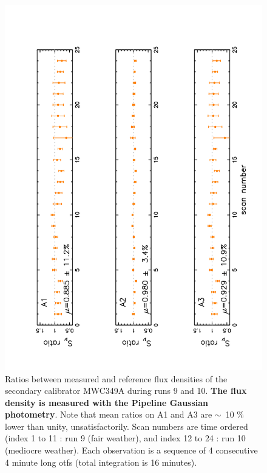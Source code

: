 \begin{figure}[p]
\begin{center}
  \includegraphics[clip, angle=-90, scale=0.6]{Figures/Ratio_vs_index_MWC349_r9_r10_NK.pdf}
  \caption{Ratios between measured and reference flux densities of  the secondary calibrator  MWC349A 
    during runs 9 and 10.  {\bf The flux density is measured with the Pipeline Gaussian photometry}. Note that mean ratios 
    on A1 and A3 are $\sim$~10 \% lower than unity, unsatisfactorily.
    Scan numbers are time ordered (index 1 to 11 : run 9 (fair weather), and index 12 to 24 : run 10 (mediocre weather).
    Each observation is a sequence of 4 consecutive 4 minute long otfs (total integration is 16 minutes).
  }
\label{fig:ratio_349_NK}
\end{center}
\end{figure}



